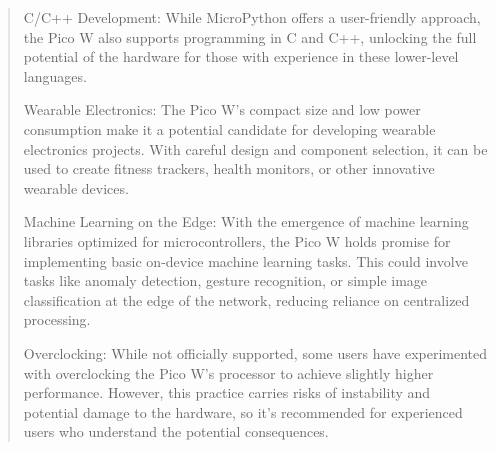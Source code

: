 \documentclass[12pt]{report}
\begin{document}
\begin{quote}
				C/C++ Development: While MicroPython offers a user-friendly approach, the Pico W also supports programming in C and C++, unlocking the full potential of the hardware for those with experience in these lower-level languages.
				
				Wearable Electronics: The Pico W's compact size and low power consumption make it a potential candidate for developing wearable electronics projects. With careful design and component selection, it can be used to create fitness trackers, health monitors, or other innovative wearable devices.
				
				Machine Learning on the Edge: With the emergence of machine learning libraries optimized for microcontrollers, the Pico W holds promise for implementing basic on-device machine learning tasks. This could involve tasks like anomaly detection, gesture recognition, or simple image classification at the edge of the network, reducing reliance on centralized processing.
				
				Overclocking: While not officially supported, some users have experimented with overclocking the Pico W's processor to achieve slightly higher performance. However, this practice carries risks of instability and potential damage to the hardware, so it's recommended for experienced users who understand the potential consequences.
			
				\end{quote}
				\clearpage
			
\end{document}
